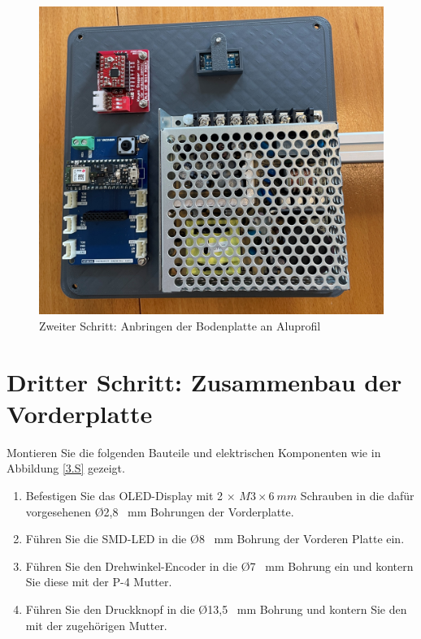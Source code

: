 \begin{figure}[H]
	\begin{center}
		\includegraphics[width=\textwidth]{Images/2Schr.jpg}
		\caption{Zweiter Schritt: Anbringen der Bodenplatte an Aluprofil} \label{2.S}
	\end{center}
\end{figure}


\section{Dritter Schritt: Zusammenbau der Vorderplatte}

Montieren Sie die folgenden Bauteile und elektrischen Komponenten wie in Abbildung \ref{3.S} gezeigt.

\begin{enumerate}
	\item Befestigen Sie das OLED-Display mit 2 $\times$ $ M3 \times 6 \ mm $ Schrauben in die dafür vorgesehenen \O 2,8 \ mm Bohrungen der Vorderplatte.
	\item Führen Sie die SMD-LED in die \O 8 \ mm Bohrung der Vorderen Platte ein.
	\item Führen Sie den Drehwinkel-Encoder in die \O 7 \ mm Bohrung ein und kontern Sie diese mit der P-4 Mutter.
	\item Führen Sie den Druckknopf in die \O 13,5 \ mm Bohrung und kontern Sie den mit der zugehörigen Mutter.
\end{enumerate}

